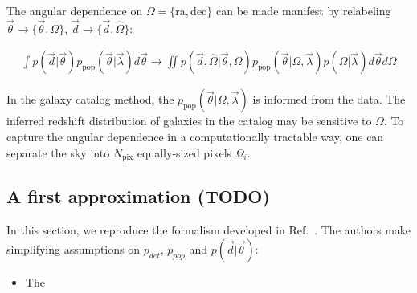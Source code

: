 \documentclass[%
preprint,
 amsmath,amssymb,
 aps,
]{revtex4-2}
\newcommand{\given}[2]{p( #1 | #2 )}
\newcommand{\ppop}[0]{p_{\text{pop}}}
\newcommand{\npix}[0]{N_{\text{pix}}}
\begin{document}
The angular dependence on $\Omega=\{\text{ra}, \text{dec} \}$ can be made manifest by relabeling
$\vec{\theta} \to \{\vec{\theta}, \Omega\}$, $\vec{d} \to \{\vec{d}, \hat{\Omega}\}$:

\begin{align}
	\int \given{\vec{d}}{\vec{\theta}}\ppop (\vec{\theta}| \vec{\lambda})d\vec{\theta}
	\to \iint \given{\vec{d}, \hat{\Omega}}{\vec{\theta}, \Omega} \ppop (\vec{\theta}| \Omega, \vec{\lambda}) \given{\Omega}{\vec{\lambda}} d\vec{\theta} d\Omega
\end{align}

In the galaxy catalog method, the $\ppop (\vec{\theta}| \Omega, \vec{\lambda})$ is informed from
the data. The inferred redshift distribution of galaxies in the catalog may be sensitive to
$\Omega$. To capture the angular dependence in a computationally tractable way, one can separate
the sky into $\npix$ equally-sized pixels $\Omega_i$.

\subsection{A first approximation (TODO)}

In this section, we reproduce the formalism developed in Ref.~. The authors
make simplifying assumptions on $p_{det}$, $p_{pop}$ and $\given{\vec{d}}{\vec{\theta}}$:

\begin{itemize}
	\item The
\end{itemize}

\end{document}
